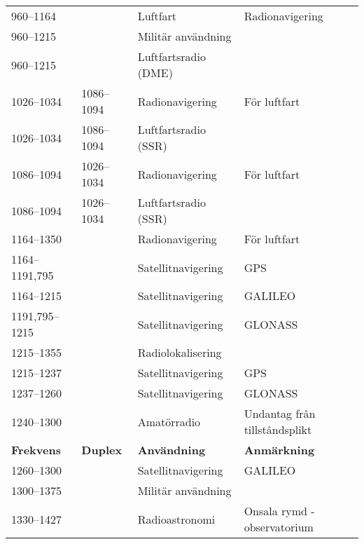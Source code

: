\documentclass[10pt,swedish,a4paper,twoside]{article}
\begin{document}
\begin{landscape}
\begin{longtable}{llll}
	960--1164          &                    & Luftfart                & Radionavigering                          \\
	960--1215          &                    & Militär användning      &  \\
	960--1215          &                    & Luftfartsradio (DME)    &  \\
	1026--1034         & 1086--1094         & Radionavigering         & För luftfart                             \\
	1026--1034         & 1086--1094         & Luftfartsradio (SSR)    &  \\
	1086--1094         & 1026--1034         & Radionavigering         & För luftfart                             \\
	1086--1094         & 1026--1034         & Luftfartsradio (SSR)    &  \\
	1164--1350         &                    & Radionavigering         & För luftfart                             \\
	1164--1191,795     &                    & Satellitnavigering      & GPS                                      \\
	1164--1215         &                    & Satellitnavigering      & GALILEO                                  \\
	1191,795--1215     &                    & Satellitnavigering      & GLONASS                                  \\
	1215--1355         &                    & Radiolokalisering       &  \\
	1215--1237         &                    & Satellitnavigering      & GPS                                      \\
	1237--1260         &                    & Satellitnavigering      & GLONASS                                  \\
	1240--1300         &                    & Amatörradio             & Undantag från tillståndsplikt            \\
	\textbf{Frekvens}  & \textbf{Duplex}    & \textbf{Användning}     & \textbf{Anmärkning}                      \\ \hline
	1260--1300         &                    & Satellitnavigering      & GALILEO                                  \\
	1300--1375         &                    & Militär användning      &  \\
	1330--1427         &                    & Radioastronomi          & Onsala rymd - observatorium              \\

\end{longtable}
\end{landscape}
\end{document}
